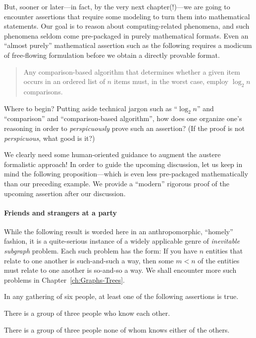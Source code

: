 But, sooner or later---in fact, by the very next chapter(!)---we are
going to encounter assertions that require some modeling to turn them
into mathematical statements.  Our goal is to reason about
computing-related phenomena, and such phenomena seldom come
pre-packaged in purely mathematical formats.  Even an ``almost
purely'' mathematical assertion such as the following requires a
modicum of free-flowing formulation before we obtain a directly
provable format.
\begin{quote}
Any comparison-based algorithm that determines whether a given item
occurs in an ordered list of $n$ items must, in the worst case, employ
$\log_2 n$ comparisons.
\end{quote}
Where to begin? Putting aside technical jargon such as ``$\log_2 n$''
and ``comparison'' and ``comparison-based algorithm'', how does one
organize one's reasoning in order to {\em perspicuously} prove such an
assertion?  (If the proof is not {\em perspicuous}, what good is it?)

We clearly need some human-oriented guidance to augment the austere
formalistic approach!  In order to guide the upcoming discussion, let
us keep in mind the following proposition---which is even less
pre-packaged mathematically than our preceding example.  We provide a
``modern'' rigorous proof of the upcoming assertion after our
discussion.

\paragraph{\small\sf Friends and strangers at a party}

While the following result is worded here in an anthropomorphic,
``homely'' fashion, it is a quite-serious instance of a widely
applicable genre of {\it inevitable subgraph} problem.
 Each such problem has the form:
If you have $n$ entities that relate to one another is such-and-such a
way, then some $m < n$ of the entities must relate to one another is
so-and-so a way.  We shall encounter more such problems in
Chapter~\ref{ch:Graphs-Trees}.

\begin{prop}
\label{thm:triangle-cotriangles}
In any gathering of six people, at least one of the following
assertions is true.

There is a group of three people who know each other.

There is a group of three people none of whom knows either of the
others.
\end{prop}

